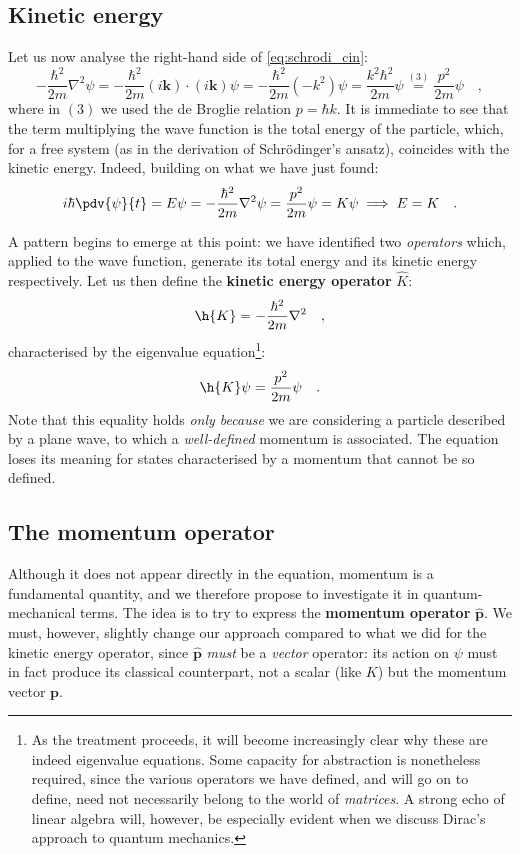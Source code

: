 \subsection{Kinetic energy}
Let us now analyse the right-hand side of \eqref{eq:schrodi_cin}:
\begin{equation*}
    -\frac{\hbar^2}{2m}\nabla^2 \psi = -\frac{\hbar^2}{2m} (i\bm{k}) \cdot (i\bm{k}) \psi = -\frac{\hbar^2}{2m} (-k^2) \psi = \frac{k^2\hbar^2}{2m} \psi \overset{(3)}{=} \frac{p^2}{2m} \psi \quad,
\end{equation*}
where in $(3)$ we used the de Broglie relation $p = \hbar k$. It is immediate to see that the term multiplying the wave function is the total energy of the particle, which, for a free system (as in the derivation of Schrödinger's ansatz), coincides with the kinetic energy. Indeed, building on what we have just found:
\[
        i\hbar\pdv{\psi}{t} = E\psi = -\frac{\hbar^2}{2m}\nabla^2\psi = \frac{p^2}{2m}\psi = K\psi \implies
        E = K \quad.
\]

A pattern begins to emerge at this point: we have identified two \emph{operators} which, applied to the wave function, generate its total energy and its kinetic energy respectively. Let us then define the \textbf{kinetic energy operator} $\hat{K}$:
\begin{equation}
    {\h{K} = -\frac{\hbar^2}{2m}\nabla^2} \quad,
    \label{eq:operatore_K}
\end{equation}
characterised by the eigenvalue equation\footnote{As the treatment proceeds, it will become increasingly clear why these are indeed eigenvalue equations. Some capacity for abstraction is nonetheless required, since the various operators we have defined, and will go on to define, need not necessarily belong to the world of \emph{matrices}. A strong echo of linear algebra will, however, be especially evident when we discuss Dirac's approach to quantum mechanics.}:
\[
    \h{K}\psi = \frac{p^2}{2m} \psi \quad.
\]
Note that this equality holds \emph{only because} we are considering a particle described by a plane wave, to which a \emph{well-defined} momentum is associated. The equation loses its meaning for states characterised by a momentum that cannot be so defined.

\subsection{The momentum operator}
Although it does not appear directly in the equation, momentum is a fundamental quantity, and we therefore propose to investigate it in quantum-mechanical terms. The idea is to try to express the \textbf{momentum operator} $\hat{\bm{p}}$. We must, however, slightly change our approach compared to what we did for the kinetic energy operator, since $\hat{\bm{p}}$ \emph{must} be a \emph{vector} operator: its action on $\psi$ must in fact produce its classical counterpart, not a scalar (like $K$) but the momentum vector $\bm{p}$.

